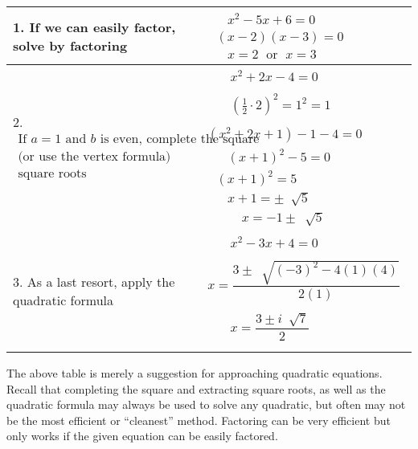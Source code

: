 \documentclass[12pt]{book}
\theoremstyle{definition}
\newcommand{\tmop}[1]{\ensuremath{\operatorname{#1}}}
\begin{document}
\begin{center}
\begin{tabular}{|l|l|}
  \hline
  1. If we can easily factor, solve by factoring & $\begin{array}{l}
    ~~~~~~~x^2 - 5 x + 6 = 0\\
    ~~~(x - 2) (x - 3) = 0\\
    ~~~~~~~x = 2 \tmop{~or~} x = 3
  \end{array}$\\
  \hline
  2.~$\begin{array}{l}
	\text{If~} a=1 \text{~and~} b \text{~is even, complete the square}\\
	\text{(or use the vertex formula) and extract}\\
	\text{square roots}
	\end{array}$ & $\begin{array}{l}
    ~~~~~~~~x^2 + 2 x - 4=0\\
    ~\\
		~~~~~~~~\left( \frac{1}{2} \cdot 2 \right)^2 = 1^2 = 1\\
    ~\\
		(x^2 + 2 x + 1) -1-4=0\\
    ~~~~~~~(x + 1)^2 - 5=0\\
    ~~~(x + 1)^2=5\\
    ~~~~~~~x + 1 = \pm~ \sqrt[]{5}\\
    ~~~~~~~~~~~~x = - 1 \pm~ \sqrt[]{5}
  \end{array}$\\
  \hline
  3. As a last resort, apply the quadratic formula & $\begin{array}{l}
    ~~~~~~~~x^2 - 3 x + 4 = 0\\
    ~\\
		x = \dfrac{3 \pm~ \sqrt[]{(- 3)^2 - 4 (1) (4)}}{2 (1)}\\
    ~\\
		~~~~~~~~x = \dfrac{3 \pm i~ \sqrt[]{7}}{2}\\
		~
  \end{array}$\\
  \hline
\end{tabular}
\end{center}
The above table is merely a suggestion for approaching quadratic equations. Recall that completing the square and extracting square roots, as well as the quadratic formula may always be used to solve any quadratic, but often may not be the most efficient or ``cleanest'' method. Factoring can be very efficient but only works if the given equation can be easily factored.
\end{document}
